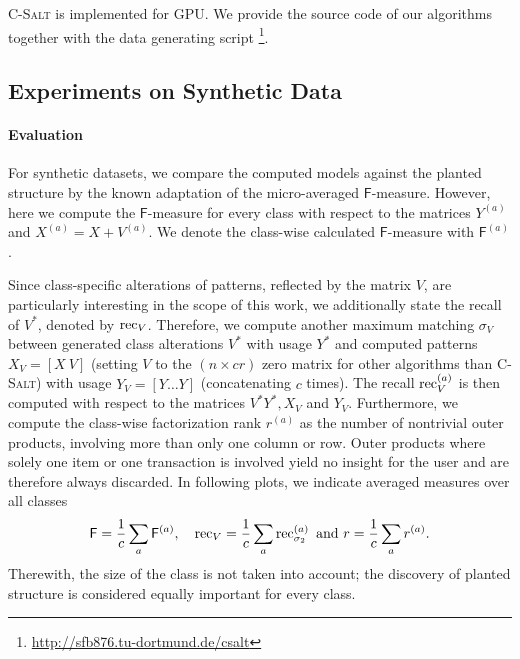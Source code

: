 \textsc{C-Salt} is implemented for GPU. We provide the source code of our algorithms together with the data generating script \footnote{\url{http://sfb876.tu-dortmund.de/csalt}}.
\subsection{Experiments on Synthetic Data}\label{sec:CS:synthExp}
\paragraph{Evaluation}
For synthetic datasets, we compare the computed models against the planted structure by the known adaptation of the micro-averaged $\mathsf{F}$-measure. However, here we compute the $\mathsf{F}$-measure for every class with respect to the matrices $Y^{(a)}$ and $X^{(a)}=X+V^{(a)}$. We denote the class-wise calculated $\mathsf{F}$-measure with $\mathsf{F}^{(a)}$.

Since class-specific alterations of patterns, reflected by the matrix $V$, are particularly interesting in the scope of this work, we additionally state the recall of $V^*$, denoted by $\operatorname{rec}_V$. Therefore, we compute another maximum matching $\sigma_V$ between generated class alterations $V^*$ with usage $Y^*$ and computed patterns $X_V=[X\ V]$ (setting $V$ to the $(n\times cr)$ zero matrix for other algorithms than \textsc{C-Salt}) with usage $Y_V=[Y \ldots Y]$ (concatenating $c$ times). The recall $\operatorname{rec}_V^{(a)}$ is then computed with respect to the matrices $V^* Y^*, X_V$ and $Y_V$.
Furthermore, we compute the class-wise factorization rank $r^{(a)}$ as the number of nontrivial outer products, involving more than only one column or row. Outer products where solely one item or one transaction is involved yield no insight for the user and are therefore always discarded. In following plots, we indicate averaged measures over all classes
\[ \mathsf{F}=\frac{1}{c}\sum_a \mathsf{F}^{(a)}, \quad \operatorname{rec}_V=\frac{1}{c}\sum_a \operatorname{rec}^{(a)}_{\sigma_2} \text{ and } r=\frac{1}{c}\sum_a r^{(a)}.
\]
Therewith, the size of the class is not taken into account; the discovery of planted structure is considered equally important for every class.
